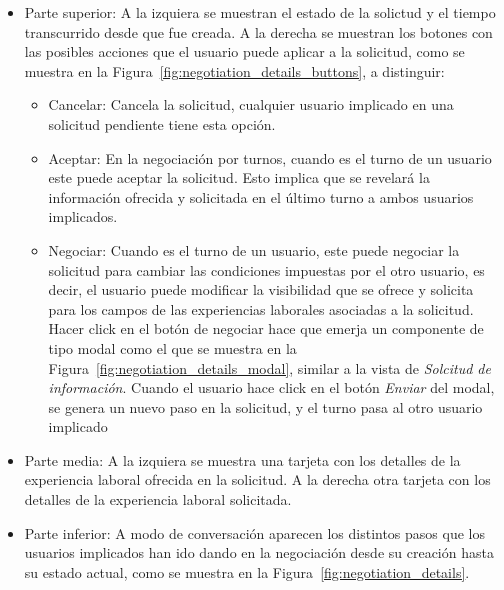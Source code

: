 \documentclass[a4paper, 12pt]{book}
\begin{document}
    \begin{itemize}
        \item Parte superior: A la izquiera se muestran el estado de la solictud y el tiempo transcurrido desde que fue creada.
        A la derecha se muestran los botones con las posibles acciones que el usuario puede aplicar a la solicitud,
        como se muestra en la Figura~\ref{fig:negotiation_details_buttons}, a distinguir:
        \begin{itemize}
            \item Cancelar: Cancela la solicitud, cualquier usuario implicado en una solicitud pendiente tiene esta opción.
            \item Aceptar: En la negociación por turnos, cuando es el turno de un usuario este puede aceptar la solicitud.
            Esto implica que se revelará la información ofrecida y solicitada en el último turno a ambos usuarios implicados.
            \item Negociar: Cuando es el turno de un usuario, este puede negociar la solicitud para cambiar las condiciones impuestas
            por el otro usuario, es decir, el usuario puede modificar la visibilidad que se ofrece
            y solicita para los campos de las experiencias laborales asociadas a la solicitud.
            Hacer click en el botón de negociar hace que emerja un componente de tipo modal como el que se muestra en
            la Figura~\ref{fig:negotiation_details_modal}, similar a la vista de \emph{Solcitud de información}.
            Cuando el usuario hace click en el botón \emph{Enviar} del modal, se genera un nuevo paso en la solicitud,
            y el turno pasa al otro usuario implicado
        \end{itemize}
        \item Parte media: A la izquiera se muestra una tarjeta con los detalles de la experiencia laboral ofrecida en la solicitud.
        A la derecha otra tarjeta con los detalles de la experiencia laboral solicitada.
        \item Parte inferior: A modo de conversación aparecen los distintos pasos que los usuarios
        implicados han ido dando en la negociación desde su creación hasta su estado actual, como se muestra en la Figura~\ref{fig:negotiation_details}.
    \end{itemize}
\end{document}
